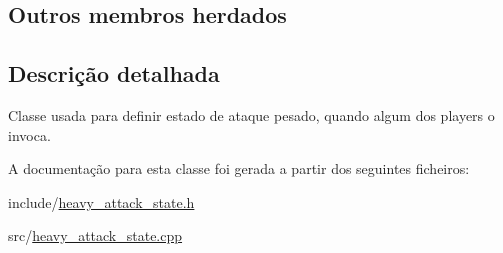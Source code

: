 \subsection*{Outros membros herdados}


\subsection{Descrição detalhada}
Classe usada para definir estado de ataque pesado, quando algum dos players o invoca. 

A documentação para esta classe foi gerada a partir dos seguintes ficheiros\+:\begin{DoxyCompactItemize}
\item 
include/\mbox{\hyperlink{heavy__attack__state_8h}{heavy\+\_\+attack\+\_\+state.\+h}}\item 
src/\mbox{\hyperlink{heavy__attack__state_8cpp}{heavy\+\_\+attack\+\_\+state.\+cpp}}\end{DoxyCompactItemize}
